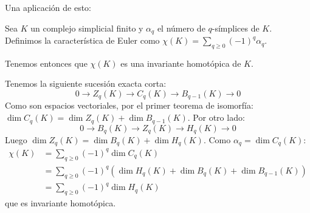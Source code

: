 \documentclass[HS.tex]{subfiles}
\begin{document}
Una aplicación de esto:
\begin{consec}
Sea $K$ un complejo simplicial finito y $\alpha_q$ el número de $q$-símplices de $K$.
Definimos la característica de Euler como $\chi(K) = \sum_{q \geq 0} (-1)^q \alpha_q$.

Tenemos entonces que $\chi(K)$ es una invariante homotópica de $K$.
\end{consec}
\begin{dem}
Tenemos la siguiente sucesión exacta corta:
\[ 0 \to Z_q(K) \to C_q(K) \to B_{q-1}(K) \to 0\]
Como son espacios vectoriales, por el primer teorema de isomorfía: $\dim C_q(K) = \dim Z_q(K) + \dim B_{q-1}(K)$.
Por otro lado:
\[ 0 \to B_q(K) \to Z_q(K) \to H_q(K) \to 0\]
Luego $\dim Z_q(K) = \dim B_q(K) + \dim H_q(K)$.
Como $\alpha_q = \dim C_q(K)$:
\begin{align*}
\chi(K) & = \sum_{q \geq 0} (-1)^q \dim C_q(K)\\
 & = \sum_{q \geq 0} (-1)^q \left(\dim H_q(K) + \dim B_q(K) + \dim B_{q-1}(K)\right)\\
 & = \sum_{q \geq 0} (-1)^q \dim H_q(K)
\end{align*}
que es invariante homotópica.
\end{dem}
\end{document}

